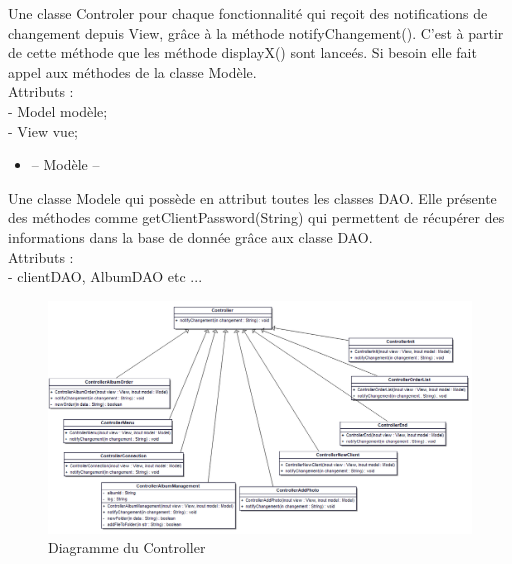 \documentclass{article}
\begin{document}
\begin{flushleft}
Une classe Controler pour chaque fonctionnalité qui reçoit des notifications
de changement depuis View, grâce à la méthode notifyChangement(). C'est à
partir de cette méthode que les méthode displayX() sont lanceés. Si besoin
elle fait appel aux méthodes de la classe Modèle.\\
Attributs :\\

- Model modèle;\\
- View vue;\\

\vspace{1\baselineskip}
\begin{itemize}
  \item -- Modèle --
\end{itemize}

Une classe Modele qui possède en attribut toutes les classes DAO. Elle
présente des méthodes comme getClientPassword(String) qui permettent de
récupérer des informations dans la base de donnée grâce aux classe DAO.\\
Attributs :\\
- clientDAO, AlbumDAO etc ...
\vspace{1\baselineskip}




\begin{figure}[!h]
  \begin{center}
    \includegraphics[scale=0.45]{fig6} %
    \caption{Diagramme du Controller}
  \end{center}
\end{figure}


\end{flushleft}
\end{document}
